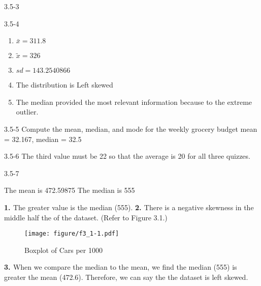 \begin{exsol@solution}{3.5-3}


\end{exsol@solution}
\begin{exsol@solution}{3.5-4}
\begin{enumerate}
\item $\bar{x} = 311.8$
\item $\tilde{x} = 326$
\item $sd = 143.2540866 $
\item The distribution is Left skewed
\item The median provided the most relevant information because to the extreme outlier.
\end{enumerate}

\end{exsol@solution}
\begin{exsol@solution}{3.5-5}
	Compute the mean, median, and mode for the weekly grocery budget
	mean = 32.167, median = 32.5

\end{exsol@solution}
\begin{exsol@solution}{3.5-6}
	The third value must be 22 so that the average is 20 for all three quizzes.

\end{exsol@solution}
\begin{exsol@solution}{3.5-7}



    The mean is 472.59875
    The median is 555

{\bf{1. }} The greater value is the median (555).  {\bf{2. }} There is a negative skewness in the middle half the of the dataset.  (Refer to Figure 3.1.)

\begin{figure}[htbp] %
   \centering
   \texttt{[image: figure/f3\_1-1.pdf]}
   \caption{Boxplot of Cars per 1000}
   \label{fig:f3_1}
\end{figure}

{\bf{3. }} When we compare the median to the mean, we find the median (555) is greater the mean (472.6).  Therefore, we can say the the dataset is left skewed.

\end{exsol@solution}
